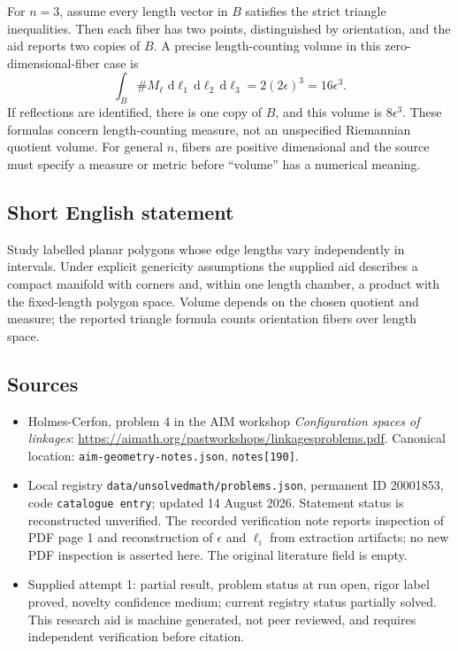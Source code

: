 \documentclass[11pt]{article}
\newcommand{\dd}{\,\mathrm{d}}
\begin{document}
For \(n=3\), assume every length vector in \(B\) satisfies the strict triangle inequalities. Then each fiber has two points, distinguished by orientation, and the aid reports two copies of \(B\). A precise length-counting volume in this zero-dimensional-fiber case is
\[
\int_B\#M_\ell\,\dd\ell_1\dd\ell_2\dd\ell_3
=2(2\epsilon)^3=16\epsilon^3.
\]
If reflections are identified, there is one copy of \(B\), and this volume is \(8\epsilon^3\). These formulas concern length-counting measure, not an unspecified Riemannian quotient volume. For general \(n\), fibers are positive dimensional and the source must specify a measure or metric before ``volume'' has a numerical meaning.
\subsection{Short English statement}
Study labelled planar polygons whose edge lengths vary independently in intervals. Under explicit genericity assumptions the supplied aid describes a compact manifold with corners and, within one length chamber, a product with the fixed-length polygon space. Volume depends on the chosen quotient and measure; the reported triangle formula counts orientation fibers over length space.
\subsection{Sources}
\begin{itemize}
\item Holmes-Cerfon, problem 4 in the AIM workshop \emph{Configuration spaces of linkages}: \url{https://aimath.org/pastworkshops/linkagesproblems.pdf}. Canonical location: \texttt{aim-geometry-notes.json}, \texttt{notes[190]}.
\item Local registry \texttt{data/unsolvedmath/problems.json}, permanent ID 20001853, code \texttt{catalogue entry}; updated 14 August 2026. Statement status is reconstructed unverified. The recorded verification note reports inspection of PDF page 1 and reconstruction of \(\epsilon\) and \(\ell_i\) from extraction artifacts; no new PDF inspection is asserted here. The original literature field is empty.
\item Supplied attempt 1: partial result, problem status at run open, rigor label proved, novelty confidence medium; current registry status partially solved. This research aid is machine generated, not peer reviewed, and requires independent verification before citation.
\end{itemize}
\end{document}
